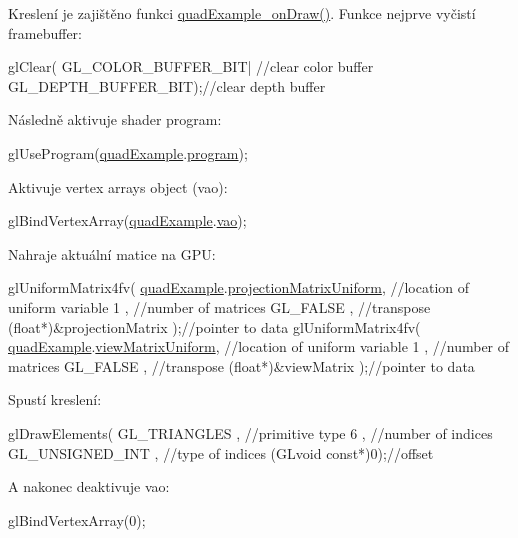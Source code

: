 Kreslení je zajištěno funkci \hyperlink{quadExample_8c_a357ede357c44b3a5a41681591a1108c8}{quad\-Example\-\_\-on\-Draw()}. Funkce nejprve vyčistí framebuffer\-: 
\begin{DoxyCodeInclude}
  glClear(
      GL\_COLOR\_BUFFER\_BIT| \textcolor{comment}{//clear color buffer}
      GL\_DEPTH\_BUFFER\_BIT);\textcolor{comment}{//clear depth buffer}
\end{DoxyCodeInclude}
Následně aktivuje shader program\-: 
\begin{DoxyCodeInclude}
  glUseProgram(\hyperlink{quadExample_8c_ad961415145a9c30bd9846d4a278cc63a}{quadExample}.\hyperlink{structQuadExampleVariables_a63971781ff860bd201886926f943ba78}{program});
\end{DoxyCodeInclude}
Aktivuje vertex arrays object (vao)\-: 
\begin{DoxyCodeInclude}
  glBindVertexArray(\hyperlink{quadExample_8c_ad961415145a9c30bd9846d4a278cc63a}{quadExample}.\hyperlink{structQuadExampleVariables_a294c388653d62435d7eeb7994f45c4fc}{vao});
\end{DoxyCodeInclude}
Nahraje aktuální matice na G\-P\-U\-: 
\begin{DoxyCodeInclude}
  glUniformMatrix4fv(
      \hyperlink{quadExample_8c_ad961415145a9c30bd9846d4a278cc63a}{quadExample}.\hyperlink{structQuadExampleVariables_a38a1023cb8ee3692e195ea574e43c51a}{projectionMatrixUniform}, \textcolor{comment}{//location of uniform variable}
      1                                  , \textcolor{comment}{//number of matrices}
      GL\_FALSE                           , \textcolor{comment}{//transpose}
      (\textcolor{keywordtype}{float}*)&projectionMatrix          );\textcolor{comment}{//pointer to data}
  glUniformMatrix4fv(
      \hyperlink{quadExample_8c_ad961415145a9c30bd9846d4a278cc63a}{quadExample}.\hyperlink{structQuadExampleVariables_a9c505e0a089ecd495b18550309ebab77}{viewMatrixUniform}, \textcolor{comment}{//location of uniform variable}
      1                            , \textcolor{comment}{//number of matrices}
      GL\_FALSE                     , \textcolor{comment}{//transpose}
      (\textcolor{keywordtype}{float}*)&viewMatrix          );\textcolor{comment}{//pointer to data}
\end{DoxyCodeInclude}
Spustí kreslení\-: 
\begin{DoxyCodeInclude}
  glDrawElements(
      GL\_TRIANGLES    , \textcolor{comment}{//primitive type}
      6               , \textcolor{comment}{//number of indices}
      GL\_UNSIGNED\_INT , \textcolor{comment}{//type of indices}
      (GLvoid \textcolor{keyword}{const}*)0);\textcolor{comment}{//offset}
\end{DoxyCodeInclude}
A nakonec deaktivuje vao\-: 
\begin{DoxyCodeInclude}
  glBindVertexArray(0);
\end{DoxyCodeInclude}
 
\begin{DoxyCodeInclude}
\end{DoxyCodeInclude}
 